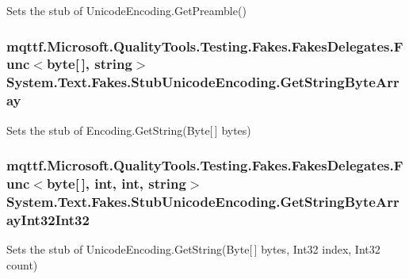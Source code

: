 Sets the stub of Unicode\-Encoding.\-Get\-Preamble()

\hypertarget{class_system_1_1_text_1_1_fakes_1_1_stub_unicode_encoding_a58ddbf701af7a1905cf829a33402fbfe}{
\subsubsection[{Get\-String\-Byte\-Array}]{\setlength{\rightskip}{0pt plus 5cm}mqttf.\-Microsoft.\-Quality\-Tools.\-Testing.\-Fakes.\-Fakes\-Delegates.\-Func$<$byte\mbox{[}$\,$\mbox{]}, string$>$ System.\-Text.\-Fakes.\-Stub\-Unicode\-Encoding.\-Get\-String\-Byte\-Array}}\label{class_system_1_1_text_1_1_fakes_1_1_stub_unicode_encoding_a58ddbf701af7a1905cf829a33402fbfe}


Sets the stub of Encoding.\-Get\-String(\-Byte\mbox{[}$\,$\mbox{]} bytes)

\hypertarget{class_system_1_1_text_1_1_fakes_1_1_stub_unicode_encoding_a6cb7579defd1da396857f4a397d56e02}{
\subsubsection[{Get\-String\-Byte\-Array\-Int32\-Int32}]{\setlength{\rightskip}{0pt plus 5cm}mqttf.\-Microsoft.\-Quality\-Tools.\-Testing.\-Fakes.\-Fakes\-Delegates.\-Func$<$byte\mbox{[}$\,$\mbox{]}, int, int, string$>$ System.\-Text.\-Fakes.\-Stub\-Unicode\-Encoding.\-Get\-String\-Byte\-Array\-Int32\-Int32}}\label{class_system_1_1_text_1_1_fakes_1_1_stub_unicode_encoding_a6cb7579defd1da396857f4a397d56e02}


Sets the stub of Unicode\-Encoding.\-Get\-String(\-Byte\mbox{[}$\,$\mbox{]} bytes, Int32 index, Int32 count)

